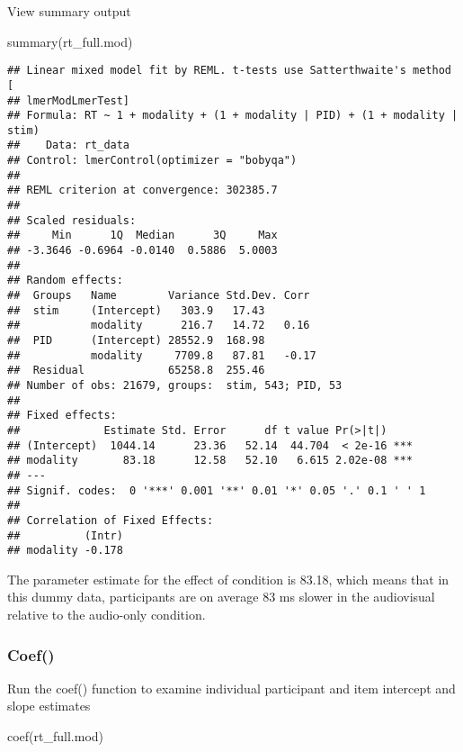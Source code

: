 \documentclass[
]{article}
\newenvironment{Shaded}{\begin{snugshade}}{\end{snugshade}}
\newcommand{\FunctionTok}[1]{\textcolor[rgb]{0.00,0.00,0.00}{#1}}
\newcommand{\NormalTok}[1]{#1}
\begin{document}
View summary output

\begin{Shaded}
\begin{Highlighting}[]
\FunctionTok{summary}\NormalTok{(rt\_full.mod) }
\end{Highlighting}
\end{Shaded}

\begin{verbatim}
## Linear mixed model fit by REML. t-tests use Satterthwaite's method [
## lmerModLmerTest]
## Formula: RT ~ 1 + modality + (1 + modality | PID) + (1 + modality | stim)
##    Data: rt_data
## Control: lmerControl(optimizer = "bobyqa")
## 
## REML criterion at convergence: 302385.7
## 
## Scaled residuals: 
##     Min      1Q  Median      3Q     Max 
## -3.3646 -0.6964 -0.0140  0.5886  5.0003 
## 
## Random effects:
##  Groups   Name        Variance Std.Dev. Corr 
##  stim     (Intercept)   303.9   17.43        
##           modality      216.7   14.72   0.16 
##  PID      (Intercept) 28552.9  168.98        
##           modality     7709.8   87.81   -0.17
##  Residual             65258.8  255.46        
## Number of obs: 21679, groups:  stim, 543; PID, 53
## 
## Fixed effects:
##             Estimate Std. Error      df t value Pr(>|t|)    
## (Intercept)  1044.14      23.36   52.14  44.704  < 2e-16 ***
## modality       83.18      12.58   52.10   6.615 2.02e-08 ***
## ---
## Signif. codes:  0 '***' 0.001 '**' 0.01 '*' 0.05 '.' 0.1 ' ' 1
## 
## Correlation of Fixed Effects:
##          (Intr)
## modality -0.178
\end{verbatim}

The parameter estimate for the effect of condition is 83.18, which means
that in this dummy data, participants are on average 83 ms slower in the
audiovisual relative to the audio-only condition.

\hypertarget{coef}{%
\subsubsection{Coef()}\label{coef}}

Run the coef() function to examine individual participant and item
intercept and slope estimates

\begin{Shaded}
\begin{Highlighting}[]
\FunctionTok{coef}\NormalTok{(rt\_full.mod)}
\end{Highlighting}
\end{Shaded}
\end{document}
